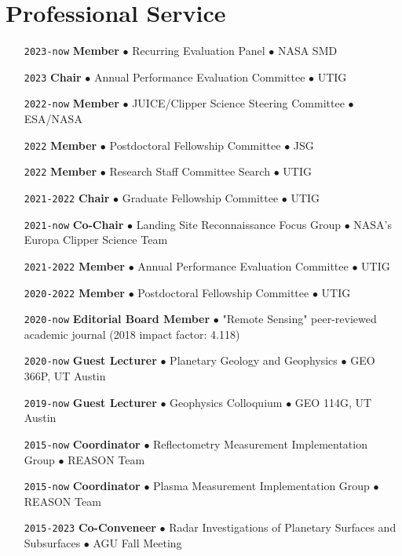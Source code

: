 \section*{Professional Service}

\begin{itemize}[leftmargin=5.8em, labelsep=1.5em]
    \setlength\itemsep{-.5em}    
    \item[\texttt{2023-now}] \textbf{Member} $\bullet$ Recurring Evaluation Panel $\bullet$ NASA SMD
    \item[\texttt{2023}] \textbf{Chair} $\bullet$ Annual Performance Evaluation Committee $\bullet$ UTIG
    \item[\texttt{2022-now}] \textbf{Member} $\bullet$ JUICE/Clipper Science Steering Committee $\bullet$ ESA/NASA
    \item[\texttt{2022}] \textbf{Member} $\bullet$ Postdoctoral Fellowship Committee $\bullet$ JSG
    \item[\texttt{2022}] \textbf{Member} $\bullet$ Research Staff Committee Search $\bullet$ UTIG
    \item[\texttt{2021-2022}] \textbf{Chair} $\bullet$ Graduate Fellowship Committee $\bullet$ UTIG
    \item[\texttt{2021-now}] \textbf{Co-Chair} $\bullet$ Landing Site Reconnaissance Focus Group  $\bullet$ NASA's Europa Clipper Science Team
    \item[\texttt{2021-2022}] \textbf{Member} $\bullet$ Annual Performance Evaluation Committee $\bullet$ UTIG
    \item[\texttt{2020-2022}] \textbf{Member} $\bullet$ Postdoctoral Fellowship Committee $\bullet$ UTIG
    \item[\texttt{2020-now}] \textbf{Editorial Board Member} $\bullet$ "Remote Sensing" peer-reviewed academic journal (2018 impact factor: 4.118)
    \item[\texttt{2020-now}] \textbf{Guest Lecturer} $\bullet$ Planetary Geology and Geophysics $\bullet$  GEO 366P, UT Austin
    \item[\texttt{2019-now}] \textbf{Guest Lecturer} $\bullet$ Geophysics Colloquium $\bullet$  GEO 114G, UT Austin
    \item[\texttt{2015-now}] \textbf{Coordinator} $\bullet$ Reflectometry Measurement Implementation Group $\bullet$ REASON Team
    \item[\texttt{2015-now}] \textbf{Coordinator} $\bullet$ Plasma Measurement Implementation Group $\bullet$ REASON Team
    \item[\texttt{2015-2023}] \textbf{Co-Conveneer} $\bullet$  Radar Investigations of Planetary Surfaces and Subsurfaces $\bullet$ AGU Fall Meeting

\end{itemize}
